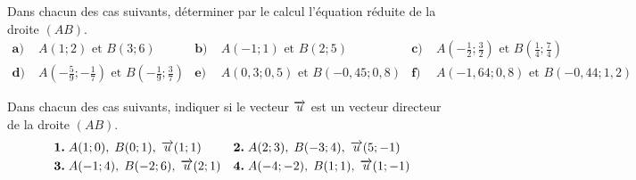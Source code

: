 \documentclass[11pt]{article}
\begin{document}
\begin{exo}
  Dans chacun des cas suivants, déterminer par le calcul l'équation réduite de
  la droite $\left( AB \right)$.
  \begin{align*}
    \textbf{a)}\;& A\left( 1; 2\right)\text{ et }B\left(
    3; 6\right) &
    \textbf{b)}\;& A\left( -1; 1\right)\text{ et }B\left(
    2; 5\right) &
    \textbf{c)}\;& A\left( -\frac{1}{2}; \frac{3}{2} \right)\text{ et }B\left(
    \frac{1}{4}; \frac{7}{4} \right) \\
    \textbf{d)}\;& A\left( -\frac{5}{9}; -\frac{1}{7} \right)\text{ et }B\left(
    -\frac{1}{9}; \frac{3}{7} \right) &
    \textbf{e)}\;& A\left( 0,3; 0,5 \right)\text{ et }B\left(
    -0,45 ; 0,8 \right) &
    \textbf{f)}\;& A\left( -1,64; 0,8\right)\text{ et }B\left(
    -0,44; 1,2 \right)
  \end{align*}
\end{exo}

\begin{exo}
  Dans chacun des cas suivants, indiquer si le vecteur $\overrightarrow{u}$ est un vecteur
  directeur de la droite $(AB)$.
  \begin{align*}
    \textbf{1.}\;& A(1;0),\; B(0;1),\;\overrightarrow{u} (1; 1) &
    \textbf{2.}\;& A(2;3),\; B(-3;4),\;\overrightarrow{u} (5;-1) \\
    \textbf{3.}\;& A(-1;4),\; B(-2;6),\;\overrightarrow{u} (2; 1) &
    \textbf{4.}\;& A(-4;-2),\; B(1;1),\;\overrightarrow{u} (1;-1)
  \end{align*}
\end{exo}
\end{document}

